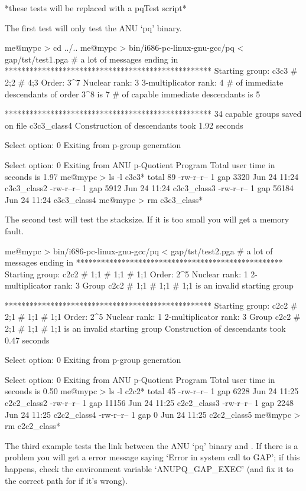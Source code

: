 *these tests will be replaced with a pqTest script*

The first test will only test the ANU `pq' binary.

\begintt
me@mypc > cd ../..
me@mypc > bin/i686-pc-linux-gnu-gcc/pq < gap/tst/test1.pga
# a lot of messages ending in
**************************************************
Starting group: c3c3 # 2;2 # 4;3
Order: 3^7
Nuclear rank: 3
3-multiplicator rank: 4
# of immediate descendants of order 3^8 is 7
# of capable immediate descendants is 5

**************************************************
34 capable groups saved on file c3c3_class4
Construction of descendants took 1.92 seconds

Select option: 0 
Exiting from p-group generation

Select option: 0 
Exiting from ANU p-Quotient Program
Total user time in seconds is 1.97
me@mypc > ls -l c3c3*
total 89
-rw-r--r--    1 gap    3320 Jun 24 11:24 c3c3_class2
-rw-r--r--    1 gap    5912 Jun 24 11:24 c3c3_class3
-rw-r--r--    1 gap   56184 Jun 24 11:24 c3c3_class4
me@mypc > rm c3c3_class*
\endtt

The second test will test the stacksize. If it is too small you will  get
a memory fault.

\begintt
me@mypc > bin/i686-pc-linux-gnu-gcc/pq < gap/tst/test2.pga
# a lot of messages ending in
**************************************************
Starting group: c2c2 # 1;1 # 1;1 # 1;1
Order: 2^5
Nuclear rank: 1
2-multiplicator rank: 3
Group c2c2 # 1;1 # 1;1 # 1;1 is an invalid starting group

**************************************************
Starting group: c2c2 # 2;1 # 1;1 # 1;1
Order: 2^5
Nuclear rank: 1
2-multiplicator rank: 3
Group c2c2 # 2;1 # 1;1 # 1;1 is an invalid starting group
Construction of descendants took 0.47 seconds

Select option: 0 
Exiting from p-group generation

Select option: 0 
Exiting from ANU p-Quotient Program
Total user time in seconds is 0.50
me@mypc > ls -l c2c2*
total 45
-rw-r--r--    1 gap   6228 Jun 24 11:25 c2c2_class2
-rw-r--r--    1 gap  11156 Jun 24 11:25 c2c2_class3
-rw-r--r--    1 gap   2248 Jun 24 11:25 c2c2_class4
-rw-r--r--    1 gap      0 Jun 24 11:25 c2c2_class5
me@mypc > rm c2c2_class*
\endtt

The third example tests the link between the ANU `pq' binary and  {\GAP}.
If there is a problem you will get  a  error  message  saying  `Error  in
system call to GAP'; if this  happens,  check  the  environment  variable
`ANUPQ_GAP_EXEC' (and fix it to the  correct  path  for  {\GAP}  if  it's
wrong).

